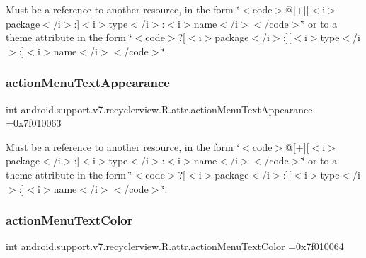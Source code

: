 Must be a reference to another resource, in the form \char`\"{}$<$code$>$@\mbox{[}+\mbox{]}\mbox{[}$<$i$>$package$<$/i$>$\+:\mbox{]}$<$i$>$type$<$/i$>$\+:$<$i$>$name$<$/i$>$$<$/code$>$\char`\"{} or to a theme attribute in the form \char`\"{}$<$code$>$?\mbox{[}$<$i$>$package$<$/i$>$\+:\mbox{]}\mbox{[}$<$i$>$type$<$/i$>$\+:\mbox{]}$<$i$>$name$<$/i$>$$<$/code$>$\char`\"{}. \mbox{\label{classandroid_1_1support_1_1v7_1_1recyclerview_1_1R_1_1attr_ab80c714807849f1883e2f59c5bd2097a}} 
\subsubsection{\texorpdfstring{action\+Menu\+Text\+Appearance}{actionMenuTextAppearance}}
{\footnotesize\ttfamily int android.\+support.\+v7.\+recyclerview.\+R.\+attr.\+action\+Menu\+Text\+Appearance =0x7f010063\hspace{0.3cm}{\ttfamily [static]}}

Must be a reference to another resource, in the form \char`\"{}$<$code$>$@\mbox{[}+\mbox{]}\mbox{[}$<$i$>$package$<$/i$>$\+:\mbox{]}$<$i$>$type$<$/i$>$\+:$<$i$>$name$<$/i$>$$<$/code$>$\char`\"{} or to a theme attribute in the form \char`\"{}$<$code$>$?\mbox{[}$<$i$>$package$<$/i$>$\+:\mbox{]}\mbox{[}$<$i$>$type$<$/i$>$\+:\mbox{]}$<$i$>$name$<$/i$>$$<$/code$>$\char`\"{}. \mbox{\label{classandroid_1_1support_1_1v7_1_1recyclerview_1_1R_1_1attr_a1ca857029b20c566d56c6b646e71847c}} 
\subsubsection{\texorpdfstring{action\+Menu\+Text\+Color}{actionMenuTextColor}}
{\footnotesize\ttfamily int android.\+support.\+v7.\+recyclerview.\+R.\+attr.\+action\+Menu\+Text\+Color =0x7f010064\hspace{0.3cm}{\ttfamily [static]}}

